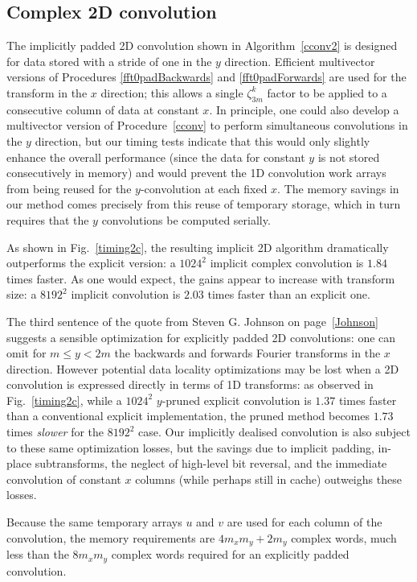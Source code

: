 \documentclass[final]{siamltex}
\begin{document}
\subsection{Complex 2D convolution}
The implicitly padded 2D convolution shown in Algorithm~\ref{cconv2} 
is designed for data stored with a stride of one in the $y$
direction. Efficient multivector versions of Procedures \ref{fft0padBackwards}
and \ref{fft0padForwards} are used for the transform in the $x$ direction;
this allows a single $\zeta_{3m}^k$ factor to be applied to a consecutive
column of data at constant $x$. In principle, one could also develop a
multivector version of Procedure~\ref{cconv} to perform simultaneous
convolutions in the $y$ direction, but our timing tests indicate that this
would only slightly enhance the overall performance (since the data for constant
$y$ is not stored consecutively in memory) and would prevent the 1D convolution
work arrays from being reused for the $y$-convolution at each fixed $x$. The
memory savings in our method comes precisely from this reuse of temporary
storage, which in turn requires that the $y$ convolutions be computed
serially.

As shown in Fig.~\ref{timing2c}, the resulting implicit
2D algorithm dramatically outperforms the explicit version:
a $1024^2$ implicit complex convolution is $1.84$ times faster.
As one would expect, the gains appear to increase with transform size: a
$8192^2$ implicit convolution is $2.03$ times faster than an explicit one. 

The third sentence of the quote from Steven G. Johnson on
page~\ref{Johnson} suggests a sensible optimization for
explicitly padded 2D convolutions: one can omit for $m \le y < 2m$
the backwards and forwards Fourier transforms in the $x$ direction.
However potential data locality optimizations may be lost
when a 2D convolution is expressed directly in terms of 1D transforms: as
observed in Fig.~\ref{timing2c}, while a $1024^2$ $y$-pruned explicit
convolution is $1.37$ times faster than a conventional explicit
implementation, the pruned method becomes $1.73$ times {\it slower} for the
$8192^2$ case. Our implicitly dealised convolution is also subject
to these same optimization losses, but the savings due to implicit padding,
in-place subtransforms, the neglect of high-level bit reversal, and the
immediate convolution of constant $x$ columns (while perhaps still in
cache) outweighs these losses.

Because the same temporary arrays $u$ and $v$ are used for each column
of the convolution, the memory requirements are $4m_xm_y+2m_y$ complex
words, much less than the $8m_xm_y$ complex words required for an
explicitly padded convolution.
\end{document}
